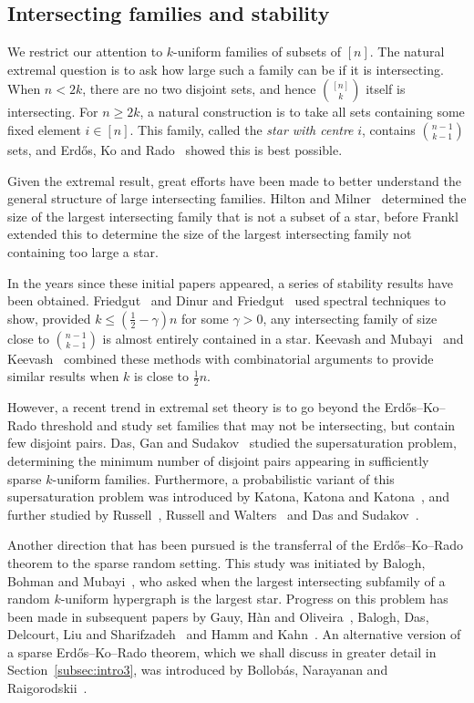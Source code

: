 \documentclass[11pt]{article}
\theoremstyle{definition}
\newcommand{\3}{\bf{3}}
\begin{document}
\subsection{Intersecting families and stability} \label{subsec:intro1}

We restrict our attention to $k$-uniform families of subsets of $[n]$.  The natural extremal question is to ask how large such a family can be if it is intersecting.  When $n < 2k$, there are no two disjoint sets, and hence $\binom{[n]}{k}$ itself is intersecting.  For $n \ge 2k$, a natural construction is to take all sets containing some fixed element $i \in [n]$.  This family, called the \emph{star with centre} $i$, contains $\binom{n-1}{k-1}$ sets, and Erd\H{o}s, Ko and Rado~\cite{ekr61} showed this is best possible.

Given the extremal result, great efforts have been made to better understand the general structure of large intersecting families.  Hilton and Milner~\cite{hm67} determined the size of the largest intersecting family that is not a subset of a star, before Frankl~\cite{fra87} extended this to determine the size of the largest intersecting family not containing too large a star.

In the years since these initial papers appeared, a series of stability results have been obtained.  Friedgut~\cite{fri08} and Dinur and Friedgut~\cite{df09} used spectral techniques to show, provided $k \le (\frac12 - \gamma)n$ for some $\gamma > 0$, any intersecting family of size close to $\binom{n-1}{k-1}$ is almost entirely contained in a star.  Keevash and Mubayi~\cite{km10} and Keevash~\cite{kee08} combined these methods with combinatorial arguments to provide similar results when $k$ is close to $\tfrac12 n$.

However, a recent trend in extremal set theory is to go beyond the Erd\H{o}s--Ko--Rado threshold and study set families that may not be intersecting, but contain few disjoint pairs.  Das, Gan and Sudakov~\cite{dgs14} studied the supersaturation problem, determining the minimum number of disjoint pairs appearing in sufficiently sparse $k$-uniform families.  Furthermore, a probabilistic variant of this supersaturation problem was introduced by Katona, Katona and Katona~\cite{kkk12}, and further studied by Russell~\cite{rus12}, Russell and Walters~\cite{rw13} and Das and Sudakov~\cite{ds14}.

Another direction that has been pursued is the transferral of the Erd\H{o}s--Ko--Rado theorem to the sparse random setting.  This study was initiated by Balogh, Bohman and Mubayi~\cite{bbm09}, who asked when the largest intersecting subfamily of a random $k$-uniform hypergraph is the largest star.  Progress on this problem has been made in subsequent papers by Gauy, H\`an and Oliveira~\cite{gho14}, Balogh, Das, Delcourt, Liu and Sharifzadeh~\cite{bddls14} and Hamm and Kahn~\cite{hk14a,hk14b}.  An alternative version of a sparse Erd\H{o}s--Ko--Rado theorem, which we shall discuss in greater detail in Section~\ref{subsec:intro3}, was introduced by Bollob\'as, Narayanan and Raigorodskii~\cite{bnr14}.
\end{document}

